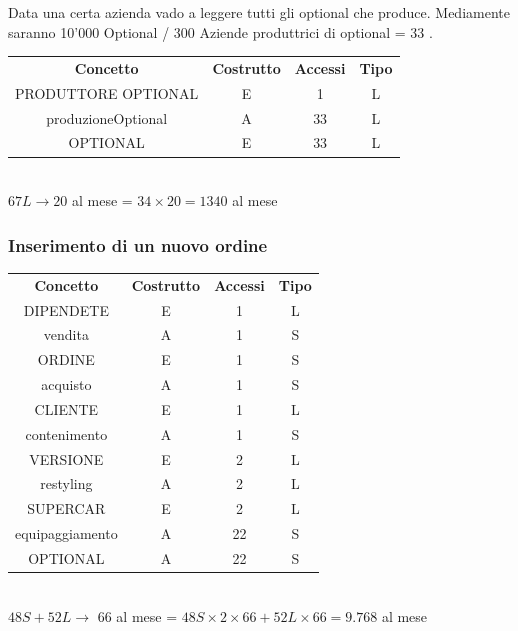 \documentclass[11pt]{article}
\begin{document}
Data una certa azienda vado a leggere tutti gli optional che produce. Mediamente
saranno 10'000 Optional / 300 Aziende produttrici di optional = 33 .

\begin{table}[H]
    \centering
    \begin{tabular}{ c c c c } 
        \rowcolor{red!20!}
        \textbf{Concetto} & \textbf{Costrutto} & \textbf{Accessi} &
        \textbf{Tipo}\\ 
        PRODUTTORE OPTIONAL & E & 1 & L \\ 
        produzioneOptional & A & 33 & L \\
        OPTIONAL & E & 33 & L \\ 
    \end{tabular}\\
    \( 67L \rightarrow 20\) al mese = \( 34 \times 20 = 1340 \) al mese
\end{table}

\subsubsection{Inserimento di un nuovo ordine} 

\begin{table}[H]
    \centering
    \begin{tabular}{ c c c c } 
        \rowcolor{red!20!}
        \textbf{Concetto} & \textbf{Costrutto} & \textbf{Accessi} &
        \textbf{Tipo}\\ 
        DIPENDETE & E & 1 & L \\
        vendita & A & 1 & S \\
        ORDINE & E & 1 & S \\ 
        acquisto & A & 1 & S \\
        CLIENTE & E & 1 & L \\  
        contenimento & A & 1 & S \\
        VERSIONE & E & 2 & L \\
        restyling & A & 2 & L \\
        SUPERCAR & E & 2 & L \\ 
        equipaggiamento & A & 22 & S \\
        OPTIONAL & A & 22 & S \\
    \end{tabular}\\
    \( 48S + 52L \rightarrow \) 66 al mese = \( 48S \times 2 \times 66 + 52L \times
    66 = 9.768\) al mese
\end{table}
\end{document}
